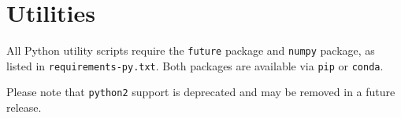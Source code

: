 \chapter{Utilities}

All Python utility scripts require the \texttt{future} package
and \texttt{numpy} package, as listed in \texttt{requirements-py.txt}.
Both packages are available via \texttt{pip} or \texttt{conda}.

Please note that \texttt{python2} support is deprecated and may be removed
in a future release.

%
%
%
%
%
%
%
%
%

